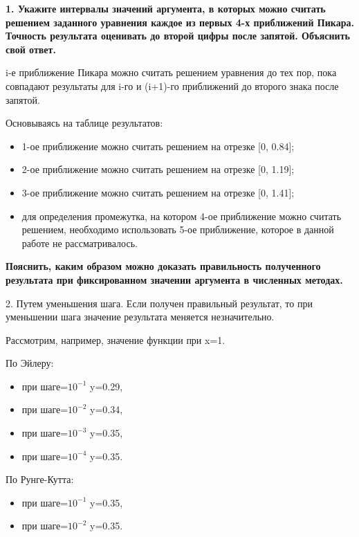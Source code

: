 \documentclass[12pt]{report}
\begin{document}
\textbf{1. Укажите интервалы значений аргумента, в которых можно считать решением заданного  уравнения каждое из первых 4-х приближений Пикара. Точность результата оценивать до второй цифры после запятой. Объяснить свой ответ.}

i-е приближение Пикара можно считать решением уравнения до тех пор, пока совпадают результаты для i-го и (i+1)-го приближений до второго знака после запятой.

Основываясь на таблице результатов:

\begin{itemize}
	\item 1-ое приближение можно считать решением на отрезке [0, 0.84];
	\item 2-ое приближение можно считать решением на отрезке [0, 1.19];
	\item 3-ое приближение можно считать решением на отрезке [0, 1.41];
	\item для определения промежутка, на котором 4-ое приближение можно считать решением, необходимо использовать 5-ое приближение, которое в данной работе не рассматривалось.
\end{itemize}



\textbf{Пояснить, каким образом можно доказать правильность полученного результата при фиксированном значении аргумента в численных методах.}

2. Путем уменьшения шага. Если получен правильный результат, то при уменьшении шага значение результата меняется незначительно.

Рассмотрим, например, значение функции при x=1.

По Эйлеру: 
\begin{itemize}
	\item при шаге=$10^{-1}$ y=0.29, 
	\item при шаге=$10^{-2}$ y=0.34, 
	\item при шаге=$10^{-3}$ y=0.35, 
	\item при шаге=$10^{-4}$ y=0.35. 
\end{itemize}

По Рунге-Кутта: 
\begin{itemize}
	\item при шаге=$10^{-1}$ y=0.35, 
	\item при шаге=$10^{-2}$ y=0.35. 
\end{itemize}
\end{document}
